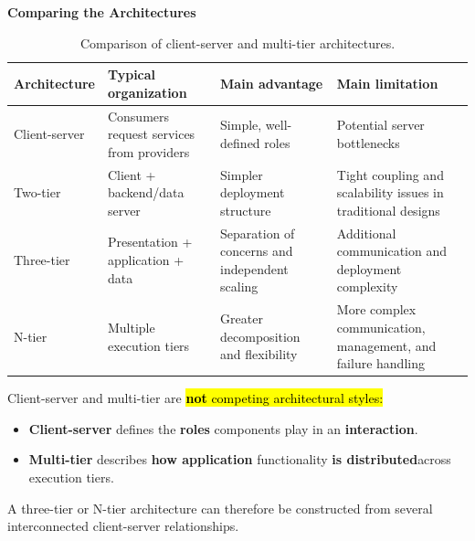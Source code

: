 \highspace
\begin{flushleft}
    \textcolor{Green3}{ \textbf{Comparing the Architectures}}
\end{flushleft}
\begin{table}[H]
    \centering
    \small
    \renewcommand{\arraystretch}{1.25}
    \begin{tabularx}{\textwidth}{@{}l
            >{\raggedright\arraybackslash}X
            >{\raggedright\arraybackslash}X
        >{\raggedright\arraybackslash}X@{}}
        \toprule
        \textbf{Architecture} & \textbf{Typical organization} & \textbf{Main advantage} & \textbf{Main limitation} \\
        \midrule
        Client-server & Consumers request services from providers & Simple, well-defined roles & Potential server bottlenecks \\[2.8em]
        Two-tier & Client + backend/data server & Simpler deployment structure & Tight coupling and scalability issues in traditional designs \\[2.8em]
        Three-tier & Presentation + application + data & Separation of concerns and independent scaling & Additional communication and deployment complexity \\[3.2em]
        N-tier & Multiple execution tiers & Greater decomposition and flexibility & More complex communication, management, and failure handling \\
        \bottomrule
    \end{tabularx}
    \caption{Comparison of client-server and multi-tier architectures.}
    \label{tab:architectures-comparison}
\end{table}

\noindent
Client-server and multi-tier are \hl{\textbf{not} competing architectural styles:}
\begin{itemize}
    \item \textbf{Client-server} defines the \textbf{roles} components play in an \textbf{interaction}.
    \item \textbf{Multi-tier} describes \textbf{how application} functionality \textbf{is distributed}\break across execution tiers.
\end{itemize}
A three-tier or N-tier architecture can therefore be constructed from several interconnected client-server relationships.

